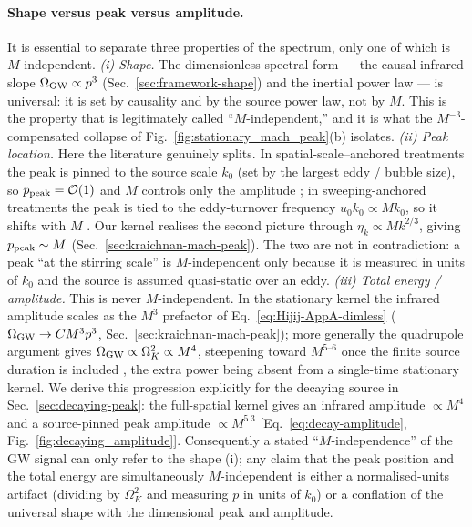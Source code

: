 \documentclass[10pt,prd,aps,nobibnotes,superscriptaddress,preprintnumbers,notitlepage]{revtex4-1}
\begin{document}
\paragraph{Shape versus peak versus amplitude.}
It is essential to separate three properties of the spectrum, only one of which
is $M$-independent.
\emph{(i) Shape.} The dimensionless spectral form — the causal infrared slope
$\Omega_{\rm GW}\propto p^3$ (Sec.~\ref{sec:framework-shape}) and the inertial
power law — is universal: it is set by causality and by the source power law,
not by $M$. This is the property that is legitimately called
``$M$-independent,'' and it is what the $M^{-3}$-compensated collapse of
Fig.~\ref{fig:stationary_mach_peak}(b) isolates.
\emph{(ii) Peak location.} Here the literature genuinely splits. In
spatial-scale–anchored treatments the peak is pinned to the source scale $k_0$
(set by the largest eddy / bubble size), so $p_{\rm peak}=\mathcal O(1)$ and $M$
controls only the amplitude \cite{Caprini:2018mtu}; in sweeping-anchored
treatments the peak is tied to the eddy-turnover frequency $u_0 k_0\propto M
k_0$, so it shifts with $M$ \cite{Gogoberidze:2007an,RoperPol:2019wvy}. Our kernel
realises the second picture through $\eta_k\propto M k^{2/3}$, giving
$p_{\rm peak}\sim M$ (Sec.~\ref{sec:kraichnan-mach-peak}). The two are not in
contradiction: a peak ``at the stirring scale'' is $M$-independent only because
it is measured in units of $k_0$ and the source is assumed quasi-static over an
eddy.
\emph{(iii) Total energy / amplitude.} This is never $M$-independent. In the
stationary kernel the infrared amplitude scales as the $M^3$ prefactor of
Eq.~\eqref{eq:Hijij-AppA-dimless} ($\Omega_{\rm GW}\to C M^3 p^3$,
Sec.~\ref{sec:kraichnan-mach-peak}); more generally the quadrupole argument
gives $\Omega_{\rm GW}\propto\Omega_K^2\propto M^4$, steepening toward
$M^{5\text{--}6}$ once the finite source duration is included
\cite{Caprini:2018mtu}, the extra power being absent from a single-time
stationary kernel. We derive this progression explicitly for the decaying source
in Sec.~\ref{sec:decaying-peak}: the full-spatial kernel gives an infrared
amplitude $\propto M^4$ and a source-pinned peak amplitude $\propto M^{5.3}$
[Eq.~\eqref{eq:decay-amplitude}, Fig.~\ref{fig:decaying_amplitude}]. Consequently a stated ``$M$-independence'' of the GW signal
can only refer to the shape (i); any claim that the peak position and the total
energy are simultaneously $M$-independent is either a normalised-units artifact
(dividing by $\Omega_K^2$ and measuring $p$ in units of $k_0$) or a conflation
of the universal shape with the dimensional peak and amplitude.
\end{document}
